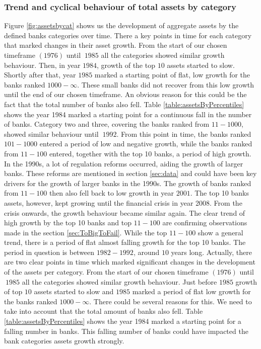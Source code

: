 \documentclass[12pt, a4paper]{article} %
\begin{document}
\subsubsection{Trend and cyclical behaviour of total assets by category}
Figure \ref{fig:assetsbycat} shows us the development of aggregate assets by the defined banks categories over time. 
There a key points in time for each category that marked changes in their asset growth. From the start of our chosen timeframe $(1976)$ until $~1985$ all the categories showed similar growth behaviour. Then, in year $1984$, growth of the top $10$ assets started to slow. Shortly after that, year $1985$ marked a starting point of flat, low growth for the banks ranked $1000-\infty$. These small banks did not recover from this low growth until the end of our chosen timeframe. An obvious reason for this could be the fact that the  total number of banks also fell. Table \ref{table:assetsByPercentiles} shows the year 1984 marked a starting point for a continuous fall in the number of banks. Category two and three, covering the banks ranked from $11-1000$, showed similar behaviour until $~1992$. From this point in time, the banks ranked $101-1000$ entered a period of low and negative growth, while the banks ranked from $11-100$ entered, together with the top 10 banks, a period of high growth. In the 1990s, a lot of regulation reforms occurred, aiding the growth of larger banks. These reforms are mentioned in section \ref{sec:data} and could have been key drivers for the growth of larger banks in the 1990s.
The growth of banks ranked from $11-100$ then also fell back to low growth in year $2001$. The top 10 banks assets, however, kept growing until the financial crisis in year 2008. 
\iffalse
From the crisis onwards, the growth behaviour became similar again.  
The clear trend of high growth by the top 10 banks and top $11-100$ are confirming observations made in the section \ref{sec:ToBigToFail}. While the top $11-100$ show a general trend, there is a period of flat almost falling growth for the top 10 banks. The period in question is between $1982-1992$, around $10$ years long. Actually, there are two clear points in time which marked significant changes in the development of the assets per category. From the start of our chosen timeframe $(1976)$ until $~1985$ all the categories showed similar growth behaviour. Just before $1985$ growth of top $10$ assets started to slow and $1985$ marked a period of flat low growth for the banks ranked $1000-\infty$. There could be several reasons for this. We need to take into account that the total amount of banks also fell. Table \ref{table:assetsByPercentiles} shows the year 1984 marked a starting point for a falling number in banks. This falling number of banks could have impacted the bank categories assets growth strongly. 
\end{document}

